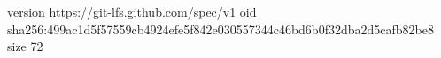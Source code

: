 version https://git-lfs.github.com/spec/v1
oid sha256:499ac1d5f57559cb4924efe5f842e030557344c46bd6b0f32dba2d5cafb82be8
size 72
